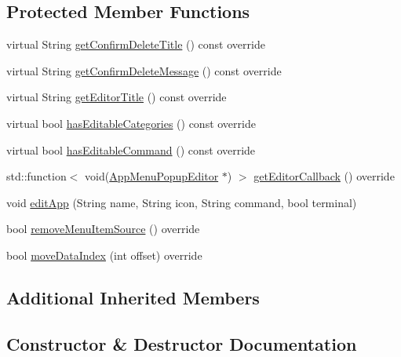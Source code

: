 \subsection*{Protected Member Functions}
\begin{DoxyCompactItemize}
\item 
virtual String \mbox{\hyperlink{classConfigAppMenuItem_a7fa58af5cacd6c4dbd891a959efe1c07}{get\+Confirm\+Delete\+Title}} () const override
\item 
virtual String \mbox{\hyperlink{classConfigAppMenuItem_a5dd3db4741768d444af41adc11b36cde}{get\+Confirm\+Delete\+Message}} () const override
\item 
virtual String \mbox{\hyperlink{classConfigAppMenuItem_a4982d39204f8e5449917a934866fd0f3}{get\+Editor\+Title}} () const override
\item 
virtual bool \mbox{\hyperlink{classConfigAppMenuItem_a3fc7d1bbbe4b75e522f77d4efc688819}{has\+Editable\+Categories}} () const override
\item 
virtual bool \mbox{\hyperlink{classConfigAppMenuItem_a7c7b432e4c9e7aaf09f00c47b7f165d7}{has\+Editable\+Command}} () const override
\item 
std\+::function$<$ void(\mbox{\hyperlink{classAppMenuPopupEditor}{App\+Menu\+Popup\+Editor}} $\ast$) $>$ \mbox{\hyperlink{classConfigAppMenuItem_a82c1db45a09f0997b9f8802a3729972a}{get\+Editor\+Callback}} () override
\item 
void \mbox{\hyperlink{classConfigAppMenuItem_ad8358a8870a055bfcee96a242e452e8f}{edit\+App}} (String name, String icon, String command, bool terminal)
\item 
bool \mbox{\hyperlink{classConfigAppMenuItem_aa29ddde5f4f5c1e531bde3ea8f4d0ddb}{remove\+Menu\+Item\+Source}} () override
\item 
bool \mbox{\hyperlink{classConfigAppMenuItem_a3429460996f3d912566ab0a6c901bc11}{move\+Data\+Index}} (int offset) override
\end{DoxyCompactItemize}
\subsection*{Additional Inherited Members}


\subsection{Constructor \& Destructor Documentation}
\mbox{\label{classConfigAppMenuItem_ac310da919ec5dd0d462d15eacda9b00f}} 
